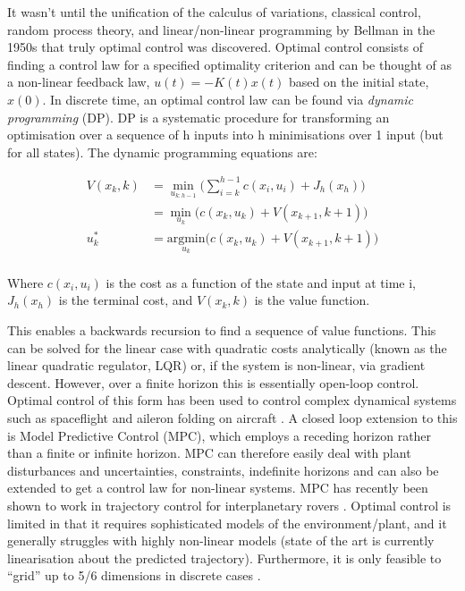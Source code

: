 \documentclass[../main.tex]{subfiles}
\begin{document}
It wasn't until the unification of the calculus of variations, classical control, random process theory, and linear/non-linear programming by Bellman in the 1950s \cite{History} that truly optimal control was discovered. Optimal control consists of finding a control law for a specified optimality criterion and can be thought of as a non-linear feedback law, $u(t) = -K(t)x(t)$ based on the initial state, $x(0)$. In discrete time, an optimal control law can be found via \textit{dynamic programming} (DP). DP is a systematic procedure for transforming an optimisation over a sequence of h inputs into h minimisations over 1 input (but for all states). The dynamic programming equations are:

\begin{align}
    \label{equ:detval} 
    V(x_k, k) & = \underset{u_{k:h-1}}{\min} \bigg( \sum_{i=k}^{h-1} c(x_i, u_i) + J_h(x_h) \bigg) \\ 
    & = \underset{u_k}{\min} \Big( c(x_k, u_k) + V(x_{k+1}, k+1) \Big) \\
    u^{*}_k & = \underset{u_k}{\text{argmin}} \Big( c(x_k, u_k) + V(x_{k+1}, k+1) \Big) \\
\end{align}

Where $c(x_i, u_i)$ is the cost as a function of the state and input at time i, $J_h(x_h)$ is the terminal cost, and $V(x_k, k)$ is the value function.

This enables a backwards recursion to find a sequence of value functions. This can be solved for the linear case with quadratic costs analytically (known as the linear quadratic regulator, LQR) or, if the system is non-linear, via gradient descent. However, over a finite horizon this is essentially open-loop control. Optimal control of this form has been used to control complex dynamical systems such as spaceflight and aileron folding on aircraft \cite{aircraftoptcont, aileronoptcont}. A closed loop extension to this is Model Predictive Control (MPC), which employs a receding horizon rather than a finite or infinite horizon. MPC can therefore easily deal with plant disturbances and uncertainties, constraints, indefinite horizons and can also be extended to get a control law for non-linear systems. MPC has recently been shown to work in trajectory control for interplanetary rovers \cite{rovermpc}. Optimal control is limited in that it requires sophisticated models of the environment/plant, and it generally struggles with highly non-linear models (state of the art is currently linearisation about the predicted trajectory). Furthermore, it is only feasible to ``grid'' up to 5/6 dimensions in discrete cases \cite{4f3}.
\end{document}
